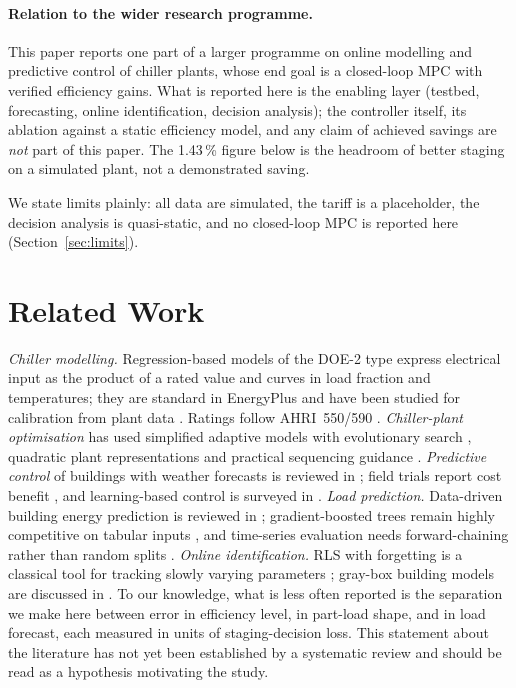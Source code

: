 \documentclass{svproc}
\begin{document}
\paragraph{Relation to the wider research programme.} This paper reports one part of a larger programme on online modelling and predictive control of chiller plants, whose end goal is a closed-loop MPC with verified efficiency gains. What is reported here is the enabling layer (testbed, forecasting, online identification, decision analysis); the controller itself, its ablation against a static efficiency model, and any claim of achieved savings are \emph{not} part of this paper. The 1.43\,\% figure below is the headroom of better staging on a simulated plant, not a demonstrated saving.

We state limits plainly: all data are simulated, the tariff is a placeholder, the decision analysis is quasi-static, and no closed-loop MPC is reported here (Section~\ref{sec:limits}).

\section{Related Work}
\emph{Chiller modelling.} Regression-based models of the DOE-2 type express electrical input as the product of a rated value and curves in load fraction and temperatures; they are standard in EnergyPlus \cite{crawley2001} and have been studied for calibration from plant data \cite{hydeman2002a,hydeman2002b}. Ratings follow AHRI~550/590 \cite{ahri550}. \emph{Chiller-plant optimisation} has used simplified adaptive models with evolutionary search \cite{ma2011}, quadratic plant representations \cite{ahn2001} and practical sequencing guidance \cite{hydeman2007}. \emph{Predictive control} of buildings with weather forecasts is reviewed in \cite{afram2014}; field trials report cost benefit \cite{sturzenegger2016}, and learning-based control is surveyed in \cite{wang2020}. \emph{Load prediction.} Data-driven building energy prediction is reviewed in \cite{amasyali2018}; gradient-boosted trees \cite{friedman2001} remain highly competitive on tabular inputs \cite{grinsztajn2022}, and time-series evaluation needs forward-chaining rather than random splits \cite{bergmeir2012}. \emph{Online identification.} RLS with forgetting is a classical tool for tracking slowly varying parameters \cite{ljung1999,astrom1995,haykin2002}; gray-box building models are discussed in \cite{braun2002,bacher2011}. To our knowledge, what is less often reported is the separation we make here between error in efficiency level, in part-load shape, and in load forecast, each measured in units of staging-decision loss. This statement about the literature has not yet been established by a systematic review and should be read as a hypothesis motivating the study.
\end{document}
